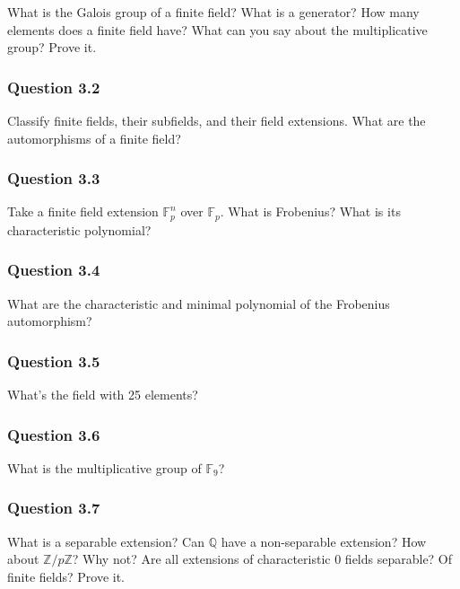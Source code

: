 What is the Galois group of a finite field? What is a generator? How
many elements does a finite field have? What can you say about the
multiplicative group? Prove it.

\hypertarget{question-3.2}{%
\subsubsection{Question 3.2}\label{question-3.2}}

Classify finite fields, their subfields, and their field extensions.
What are the automorphisms of a finite field?

\hypertarget{question-3.3}{%
\subsubsection{Question 3.3}\label{question-3.3}}

Take a finite field extension \({\mathbb{F}}_p^n\) over
\({\mathbb{F}}_p\). What is Frobenius? What is its characteristic
polynomial?

\hypertarget{question-3.4}{%
\subsubsection{Question 3.4}\label{question-3.4}}

What are the characteristic and minimal polynomial of the Frobenius
automorphism?

\hypertarget{question-3.5}{%
\subsubsection{Question 3.5}\label{question-3.5}}

What's the field with 25 elements?

\hypertarget{question-3.6}{%
\subsubsection{Question 3.6}\label{question-3.6}}

What is the multiplicative group of \({\mathbb{F}}_9\)?

\hypertarget{question-3.7}{%
\subsubsection{Question 3.7}\label{question-3.7}}

What is a separable extension? Can \({\mathbb{Q}}\) have a non-separable
extension? How about \({\mathbb{Z}}/p{\mathbb{Z}}\)? Why not? Are all
extensions of characteristic 0 fields separable? Of finite fields? Prove
it.

